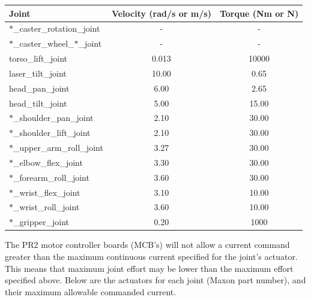 \begin{tabular}{l*{2}{c}}
Joint  & Velocity (rad/s or m/s) & Torque (Nm or N) \\
\hline \hline
$\ast$\_caster\_rotation\_joint        & -     & -  \\
$\ast$\_caster\_wheel\_$\ast$\_joint   & -     & -  \\
torso\_lift\_joint                     & 0.013 & 10000 \\
laser\_tilt\_joint                     & 10.00 & 0.65  \\
head\_pan\_joint                       & 6.00  & 2.65  \\
head\_tilt\_joint                      & 5.00  & 15.00 \\
$\ast$\_shoulder\_pan\_joint           & 2.10  & 30.00 \\
$\ast$\_shoulder\_lift\_joint          & 2.10  & 30.00 \\
$\ast$\_upper\_arm\_roll\_joint        & 3.27  & 30.00 \\
$\ast$\_elbow\_flex\_joint             & 3.30  & 30.00 \\
$\ast$\_forearm\_roll\_joint           & 3.60  & 30.00 \\
$\ast$\_wrist\_flex\_joint             & 3.10  & 10.00 \\
$\ast$\_wrist\_roll\_joint             & 3.60  & 10.00 \\
$\ast$\_gripper\_joint                 & 0.20  & 1000  \\
\end{tabular}

The PR2 motor controller boards (MCB's) will not allow a current command greater than the maximum continuous current specified for the joint's actuator. This means that maximum joint effort may be lower than the maximum effort specified above. Below are the actuators for each joint (Maxon part number), and their maximum allowable commanded current. 

